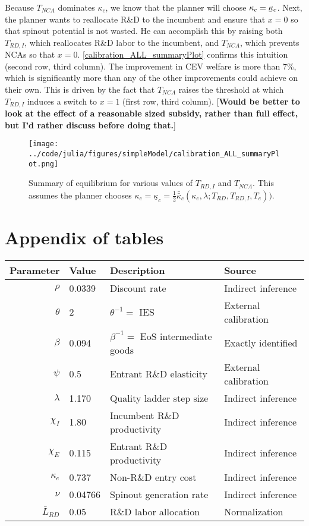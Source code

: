 \documentclass[11pt,english]{article}
\newcommand\munderbar[1]{%
	\underaccent{\bar}{#1}}
\theoremstyle{remark}
\begin{document}
Because $T_{NCA}$ dominates $\kappa_c$, we know that the planner will choose $\kappa_c = \munderbar{\kappa}_c$. Next, the planner wants to reallocate R\&D to the incumbent and ensure that $x = 0$ so that spinout potential is not wasted. He can accomplish this by raising both $T_{RD,I}$, which reallocates R\&D labor to the incumbent, and $T_{NCA}$, which prevents NCAs so that $x = 0$. \autoref{calibration_ALL_summaryPlot} confirms this intuition (second row, third column). The improvement in CEV welfare is more than 7\%, which is significantly more than any of the other improvements could achieve on their own. This is driven by the fact that $T_{NCA}$ raises the threshold at which $T_{RD,I}$ induces a switch to $x = 1$ (first row, third column). [\textbf{Would be better to look at the effect of a reasonable sized subsidy, rather than full effect, but I'd rather discuss before doing that.}] 

\begin{figure}[]
	\texttt{[image: ../code/julia/figures/simpleModel/calibration\_ALL\_summaryPlot.png]}
	\caption{Summary of equilibrium for various values of $T_{RD,I}$ and $T_{NCA}$. This assumes the planner chooses $\kappa_c = \underline{\kappa}_c = \frac{1}{2} \bar{\bar{\kappa}}_c(\kappa_e,\lambda;T_{RD},T_{RD,I},T_e))$.}
	\label{calibration_ALL_summaryPlot}
\end{figure}



\appendix

\section{Appendix of tables}





\begin{table}[!htb]
	\centering
	\label{calibration_2_parameters}
	\begin{tabular}{rlll}
		\toprule \toprule
		Parameter & Value & Description & Source \tabularnewline
		\midrule
		$\rho$ & 0.0339 & Discount rate  & Indirect inference \tabularnewline
		$\theta$ & 2 & $\theta^{-1} = $ IES & External calibration 
		\tabularnewline
		$\beta$ & 0.094 & $\beta^{-1} = $ EoS intermediate goods & Exactly identified \tabularnewline 
		$\psi$ & 0.5 & Entrant R\&D elasticity & External calibration \tabularnewline
		$\lambda$ & 1.170 & Quality ladder step size & Indirect inference 
		\tabularnewline
		$\chi_I$ & 1.80 & Incumbent R\&D productivity & Indirect inference 
		\tabularnewline
		$\chi_E$ & 0.115 & Entrant R\&D productivity & Indirect inference \tabularnewline 
		$\kappa_e$ & 0.737 & Non-R\&D entry cost & Indirect inference \tabularnewline
		$\nu$ & 0.04766 & Spinout generation rate  & Indirect inference\tabularnewline
		$\bar{L}_{RD}$ & 0.05 & R\&D labor allocation  & Normalization \tabularnewline
		\bottomrule
	\end{tabular}
\end{table}
\end{document}
